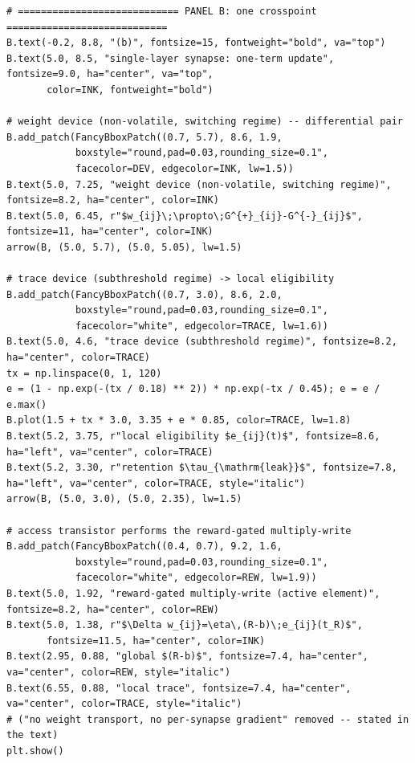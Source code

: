 \begin{lstlisting}[caption={schematics.ipynb code cell 7},label={lst:mrl-nb-schematics-7}]
# ============================ PANEL B: one crosspoint ============================
B.text(-0.2, 8.8, "(b)", fontsize=15, fontweight="bold", va="top")
B.text(5.0, 8.5, "single-layer synapse: one-term update", fontsize=9.0, ha="center", va="top",
       color=INK, fontweight="bold")

# weight device (non-volatile, switching regime) -- differential pair
B.add_patch(FancyBboxPatch((0.7, 5.7), 8.6, 1.9,
            boxstyle="round,pad=0.03,rounding_size=0.1",
            facecolor=DEV, edgecolor=INK, lw=1.5))
B.text(5.0, 7.25, "weight device (non-volatile, switching regime)", fontsize=8.2, ha="center", color=INK)
B.text(5.0, 6.45, r"$w_{ij}\;\propto\;G^{+}_{ij}-G^{-}_{ij}$", fontsize=11, ha="center", color=INK)
arrow(B, (5.0, 5.7), (5.0, 5.05), lw=1.5)

# trace device (subthreshold regime) -> local eligibility
B.add_patch(FancyBboxPatch((0.7, 3.0), 8.6, 2.0,
            boxstyle="round,pad=0.03,rounding_size=0.1",
            facecolor="white", edgecolor=TRACE, lw=1.6))
B.text(5.0, 4.6, "trace device (subthreshold regime)", fontsize=8.2, ha="center", color=TRACE)
tx = np.linspace(0, 1, 120)
e = (1 - np.exp(-(tx / 0.18) ** 2)) * np.exp(-tx / 0.45); e = e / e.max()
B.plot(1.5 + tx * 3.0, 3.35 + e * 0.85, color=TRACE, lw=1.8)
B.text(5.2, 3.75, r"local eligibility $e_{ij}(t)$", fontsize=8.6, ha="left", va="center", color=TRACE)
B.text(5.2, 3.30, r"retention $\tau_{\mathrm{leak}}$", fontsize=7.8, ha="left", va="center", color=TRACE, style="italic")
arrow(B, (5.0, 3.0), (5.0, 2.35), lw=1.5)

# access transistor performs the reward-gated multiply-write
B.add_patch(FancyBboxPatch((0.4, 0.7), 9.2, 1.6,
            boxstyle="round,pad=0.03,rounding_size=0.1",
            facecolor="white", edgecolor=REW, lw=1.9))
B.text(5.0, 1.92, "reward-gated multiply-write (active element)", fontsize=8.2, ha="center", color=REW)
B.text(5.0, 1.38, r"$\Delta w_{ij}=\eta\,(R-b)\;e_{ij}(t_R)$",
       fontsize=11.5, ha="center", color=INK)
B.text(2.95, 0.88, "global $(R-b)$", fontsize=7.4, ha="center", va="center", color=REW, style="italic")
B.text(6.55, 0.88, "local trace", fontsize=7.4, ha="center", va="center", color=TRACE, style="italic")
# ("no weight transport, no per-synapse gradient" removed -- stated in the text)
plt.show()
\end{lstlisting}

